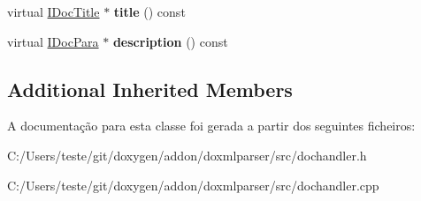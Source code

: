 \begin{DoxyCompactItemize}
\item 
\hypertarget{class_simple_sect_handler_ae3befd9a880aecec91df393b09c7ea86}{virtual \hyperlink{class_i_doc_title}{I\-Doc\-Title} $\ast$ {\bfseries title} () const }\label{class_simple_sect_handler_ae3befd9a880aecec91df393b09c7ea86}

\item 
\hypertarget{class_simple_sect_handler_a286592464b720cd61400fa22215a35c5}{virtual \hyperlink{class_i_doc_para}{I\-Doc\-Para} $\ast$ {\bfseries description} () const }\label{class_simple_sect_handler_a286592464b720cd61400fa22215a35c5}

\end{DoxyCompactItemize}
\subsection*{Additional Inherited Members}


A documentação para esta classe foi gerada a partir dos seguintes ficheiros\-:\begin{DoxyCompactItemize}
\item 
C\-:/\-Users/teste/git/doxygen/addon/doxmlparser/src/dochandler.\-h\item 
C\-:/\-Users/teste/git/doxygen/addon/doxmlparser/src/dochandler.\-cpp\end{DoxyCompactItemize}

